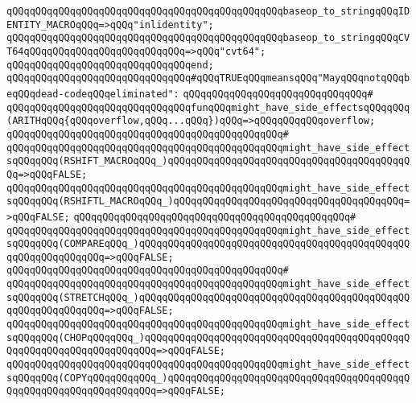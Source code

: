 \newline
\verb|qQQqqQQqqQQqqQQqqQQqqQQqqQQqqQQqqQQqqQQqqQQqqQQqbaseop_to_stringqQQqIDENTITY_MACROqQQq=>qQQq"inlidentity";|\newline
\verb|qQQqqQQqqQQqqQQqqQQqqQQqqQQqqQQqqQQqqQQqqQQqqQQqbaseop_to_stringqQQqCVT64qQQqqQQqqQQqqQQqqQQqqQQqqQQq=>qQQq"cvt64";|\newline
\verb|qQQqqQQqqQQqqQQqqQQqqQQqqQQqqQQqend;|\newline
\newline
\newline
\verb|qQQqqQQqqQQqqQQqqQQqqQQqqQQqqQQq#qQQqTRUEqQQqmeansqQQq"MayqQQqnotqQQqbeqQQqdead-codeqQQqeliminated":|\newline
\verb|qQQqqQQqqQQqqQQqqQQqqQQqqQQqqQQq#|\newline
\verb|qQQqqQQqqQQqqQQqqQQqqQQqqQQqqQQqfunqQQqmight_have_side_effectsqQQqqQQq(ARITHqQQq{qQQqoverflow,qQQq...qQQq})qQQq=>qQQqqQQqqQQqoverflow;|\newline
\verb|qQQqqQQqqQQqqQQqqQQqqQQqqQQqqQQqqQQqqQQqqQQqqQQq#|\newline
\verb|qQQqqQQqqQQqqQQqqQQqqQQqqQQqqQQqqQQqqQQqqQQqqQQqmight_have_side_effectsqQQqqQQq(RSHIFT_MACROqQQq_)qQQqqQQqqQQqqQQqqQQqqQQqqQQqqQQqqQQqqQQqqQQq=>qQQqFALSE;|\newline
\verb|qQQqqQQqqQQqqQQqqQQqqQQqqQQqqQQqqQQqqQQqqQQqqQQqmight_have_side_effectsqQQqqQQq(RSHIFTL_MACROqQQq_)qQQqqQQqqQQqqQQqqQQqqQQqqQQqqQQqqQQqqQQq=>qQQqFALSE;|\newline
\verb|qQQqqQQqqQQqqQQqqQQqqQQqqQQqqQQqqQQqqQQqqQQqqQQq#|\newline
\verb|qQQqqQQqqQQqqQQqqQQqqQQqqQQqqQQqqQQqqQQqqQQqqQQqmight_have_side_effectsqQQqqQQq(COMPAREqQQq_)qQQqqQQqqQQqqQQqqQQqqQQqqQQqqQQqqQQqqQQqqQQqqQQqqQQqqQQqqQQqqQQq=>qQQqFALSE;|\newline
\verb|qQQqqQQqqQQqqQQqqQQqqQQqqQQqqQQqqQQqqQQqqQQqqQQq#|\newline
\verb|qQQqqQQqqQQqqQQqqQQqqQQqqQQqqQQqqQQqqQQqqQQqqQQqmight_have_side_effectsqQQqqQQq(STRETCHqQQq_)qQQqqQQqqQQqqQQqqQQqqQQqqQQqqQQqqQQqqQQqqQQqqQQqqQQqqQQqqQQqqQQq=>qQQqFALSE;|\newline
\verb|qQQqqQQqqQQqqQQqqQQqqQQqqQQqqQQqqQQqqQQqqQQqqQQqmight_have_side_effectsqQQqqQQq(CHOPqQQqqQQq_)qQQqqQQqqQQqqQQqqQQqqQQqqQQqqQQqqQQqqQQqqQQqqQQqqQQqqQQqqQQqqQQqqQQqqQQq=>qQQqFALSE;|\newline
\verb|qQQqqQQqqQQqqQQqqQQqqQQqqQQqqQQqqQQqqQQqqQQqqQQqmight_have_side_effectsqQQqqQQq(COPYqQQqqQQqqQQq_)qQQqqQQqqQQqqQQqqQQqqQQqqQQqqQQqqQQqqQQqqQQqqQQqqQQqqQQqqQQqqQQqqQQq=>qQQqFALSE;|\newline
